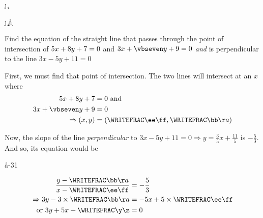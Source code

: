 


\EXPR[0]{\vbseven}{\vbtwo / \vbsix} %
\MULTIPLY\vbthree\vbfour\p
\MULTIPLY\vbfour\vbtwo\q
\MULTIPLY\vbseven\vbone\j
\MULTIPLY\vbfive\vbone\k
\MULTIPLY\vbseven\vbthree\m
\MULTIPLY\vbfive\vbtwo\n

\SUBTRACT\j\q\a
\SUBTRACT\p\k\b
\SUBTRACT\m\n\d
\FRACTIONSIMPLIFY\b\a\bb\aa
\FRACTIONSIMPLIFY\d\a\cc\dd
\FRACMULT\cc{}\ee\ff

\question[4] Find the equation of the straight line that passes through the point of intersection of 
$5 x + 8 y + 7 = 0$ and $\vbfour x + \vbseven y + \vbfive = 0$ \textit{and} is 
perpendicular to the line $3x-5y+11 = 0$

\watchout

\ifprintanswers
\fi 

\begin{solution}[\halfpage]
	First, we must find that point of intersection. The two lines will intersect at an $x$ where
	\begin{align}
	    \vbone x + \vbtwo y + \vbthree &= 0 \text{ and } \\
	    \vbfour x + \vbseven y + \vbfive &= 0 \\ 
      \Rightarrow (x,y) &= (\WRITEFRAC\ee\ff,\WRITEFRAC\bb\aa) 
	\end{align}
	
	Now, the slope of the line \textit{ perpendicular } to 
	$3x - 5y + 11 = 0 \Rightarrow y = \frac{3}{5}x + \frac{11}{5}$ is $-\frac{5}{3}$. And so, its equation
	would be 

  \FRACMULT\bb\aa{-3}{1}\jj\kk
  \FRACMULT\ee{}\mm\nn
  \FRACADD\jj\kk\mm\nn\y\z

	\begin{align}
		\dfrac{y - \WRITEFRAC\bb\aa}{x - \WRITEFRAC\ee\ff} &= -\dfrac{5}{3} \\
		\Rightarrow 3y - 3\times\WRITEFRAC\bb\aa &= -5x + 5\times\WRITEFRAC\ee\ff \\
		\text{ or } 3y + 5x + \WRITEFRAC\y\z &= 0
	\end{align}
	
\end{solution}

